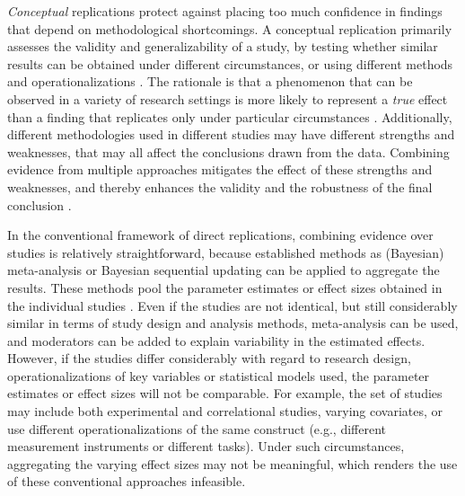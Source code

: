 \documentclass[
]{article}
\begin{document}
\emph{Conceptual} replications protect against placing too much
confidence in findings that depend on methodological shortcomings. A
conceptual replication primarily assesses the validity and
generalizability of a study, by testing whether similar results can be
obtained under different circumstances, or using different methods and
operationalizations \citep{nosek_scientific_2012}. The rationale is that
a phenomenon that can be observed in a variety of research settings is
more likely to represent a \emph{true} effect than a finding that
replicates only under particular circumstances
\citep{crandall_conceptual_2016}. Additionally, different methodologies
used in different studies may have different strengths and weaknesses,
that may all affect the conclusions drawn from the data. Combining
evidence from multiple approaches mitigates the effect of these
strengths and weaknesses, and thereby enhances the validity and the
robustness of the final conclusion
\citep{lawlor_triangulation_2017, lipton2003inference, mathison1988triangulate, munafo_robust_2018, nosek_scientific_2012}.

In the conventional framework of direct replications, combining evidence
over studies is relatively straightforward, because established methods
as (Bayesian) meta-analysis
\citep{lipsey_wilson_2001, sutton_bayesian_meta2001} or Bayesian
sequential updating \citep{schonbrodt_sequential_2017} can be applied to
aggregate the results. These methods pool the parameter estimates or
effect sizes obtained in the individual studies
\citep{cooper_handbook_2009}. Even if the studies are not identical, but
still considerably similar in terms of study design and analysis
methods, meta-analysis can be used, and moderators can be added to
explain variability in the estimated effects. However, if the studies
differ considerably with regard to research design, operationalizations
of key variables or statistical models used, the parameter estimates or
effect sizes will not be comparable. For example, the set of studies may
include both experimental and correlational studies, varying covariates,
or use different operationalizations of the same construct (e.g.,
different measurement instruments or different tasks). Under such
circumstances, aggregating the varying effect sizes may not be
meaningful, which renders the use of these conventional approaches
infeasible.
\end{document}
